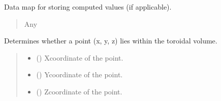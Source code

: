 \documentclass[letterpaper,10pt,english]{sphinxmanual}
\begin{document}
\begin{fulllineitems}
\begin{fulllineitems}
\begin{quote}
\begin{description}
\end{description}\end{quote}

\end{fulllineitems}


\begin{fulllineitems}
\label{\detokenize{src:src.Torus.Torus.dmap}}
\pysigstartsignatures
{}
\pysigstopsignatures
\sphinxAtStartPar
Data map for storing computed values (if applicable).
\begin{quote}\begin{description}
\sphinxAtStartPar
Any

\end{description}\end{quote}

\end{fulllineitems}


\begin{fulllineitems}
\label{\detokenize{src:src.Torus.Torus.contains_point}}
\pysigstartsignatures
{}
\pysigstopsignatures
\sphinxAtStartPar
Determines whether a point (x, y, z) lies within the toroidal volume.
\begin{quote}\begin{description}
\begin{itemize}
\item {} 
\sphinxAtStartPar
{} () \textendash{} X\sphinxhyphen{}coordinate of the point.

\item {} 
\sphinxAtStartPar
{} () \textendash{} Y\sphinxhyphen{}coordinate of the point.

\item {} 
\sphinxAtStartPar
{} () \textendash{} Z\sphinxhyphen{}coordinate of the point.


\end{itemize}
\end{description}
\end{quote}
\end{fulllineitems}
\end{fulllineitems}
\end{document}
